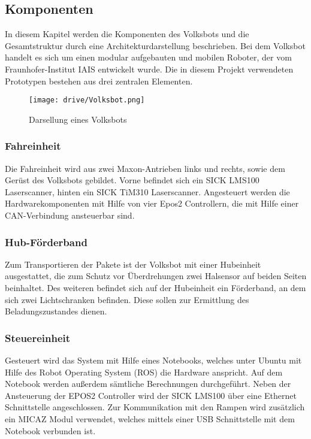 \subsection{Komponenten}

In diesem Kapitel werden die Komponenten des Volksbots und die Gesamtstruktur  durch eine Architekturdarstellung beschrieben. Bei dem Volksbot handelt es sich um einen modular aufgebauten und mobilen Roboter, der vom Fraunhofer-Institut IAIS entwickelt wurde. Die in diesem Projekt verwendeten Prototypen bestehen aus drei zentralen Elementen. 

	\begin{figure}[h!]
		\centering
			\texttt{[image: drive/Volksbot.png]}
			\caption{Darsellung eines Volksbots}
			\label{Volksbot}
	\end{figure}	




\subsubsection{Fahreinheit}

Die Fahreinheit wird aus zwei Maxon-Antrieben links und rechts, sowie dem Gerüst des Volksbots gebildet. Vorne befindet sich ein SICK LMS100 Laserscanner,  hinten ein SICK TiM310 Laserscanner. Angesteuert werden die Hardwarekomponenten mit Hilfe von vier Epos2 Controllern, die mit Hilfe einer CAN-Verbindung ansteuerbar sind. 

\subsubsection{Hub-Förderband}

Zum Transportieren der Pakete ist der Volksbot mit einer Hubeinheit ausgestattet, die zum Schutz vor Überdrehungen zwei Halsensor auf beiden Seiten beinhaltet. Des weiteren befindet sich auf der Hubeinheit ein Förderband, an dem sich zwei Lichtschranken befinden. Diese sollen zur Ermittlung des Beladungszustandes dienen. 

\subsubsection{Steuereinheit}

Gesteuert wird das System mit Hilfe eines Notebooks, welches unter Ubuntu mit Hilfe des Robot Operating System (ROS) die Hardware anspricht. Auf dem Notebook werden außerdem sämtliche 
Berechnungen durchgeführt. Neben der Ansteuerung der EPOS2 Controller wird der SICK LMS100 über eine Ethernet Schnittstelle angeschlossen. Zur Kommunikation mit den Rampen wird zusätzlich ein MICAZ Modul verwendet, welches mittels einer USB Schnittstelle mit dem Notebook verbunden ist.

